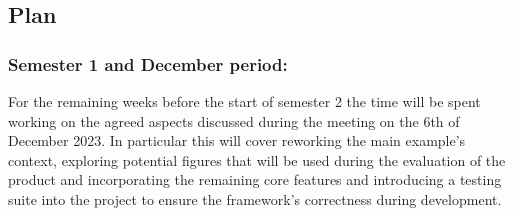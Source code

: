 \documentclass[11pt]{article}
\begin{document}
\newpage

\subsection{Plan}\label{plan}
\subsubsection{Semester 1 and December period:}\label{Semester 1}
    For the remaining weeks before the start of semester 2 the time will be spent working on the agreed aspects discussed during the meeting on the 6th of December 2023.
    In particular this will cover reworking the main example's context, exploring potential figures that will be used
    during the evaluation of the product and incorporating the remaining core features and introducing a testing suite into the project to ensure the framework's correctness during development.
\end{document}
